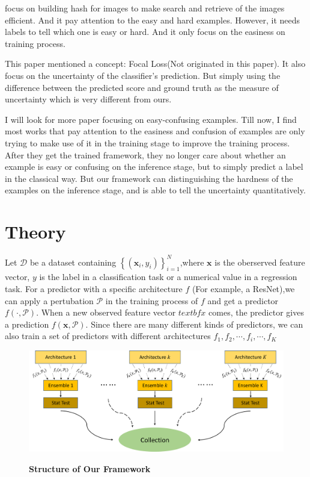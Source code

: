 \documentclass{article}
\begin{document}
\cite{deephash} focus on building hash for images to make search and retrieve of the images efficient. And it pay attention to the easy and hard examples. However, it needs labels to tell which one is easy or hard. And it only focus on the easiness on training process.

\cite{focal_loss} This paper mentioned a concept: Focal Loss(Not originated in this paper). It also focus on the uncertainty of the classifier’s prediction. But simply using the difference between the predicted score and ground truth as the measure of uncertainty which is very different from ours.

I will look for more paper focusing on easy-confusing examples. Till now, I find most works that pay attention to the easiness and confusion of examples are only trying to make use of it in the training stage to improve the training process. After they get the trained framework, they no longer care about whether an example is easy or confusing on the inference stage, but to simply predict a label in the classical way. But our framework can distinguishing the hardness of the examples on the inference stage, and is able to tell the uncertainty quantitatively.

\section{Theory}

Let $\mathcal{D}$ be a dataset containing $\left\{\left( \textbf{x}_i ,y_i\right)\right\}_{i=1}^N $,where $\textbf{x}$ is the oberserved feature vector, $y$ is the label in a classification task or a numerical value in a regression task. For a predictor with a specific architecture $f$ (For example, a ResNet),we can apply a pertubation $\mathcal{P}$ in the training process of $f$ and get a predictor $f \left(\cdot , \mathcal{P}\right)$. When a new observed feature vector $textbf{x}$ comes, the predictor gives a prediction $f \left(\textbf{x} , \mathcal{P}\right)$. Since there are many different kinds of predictors, we can also train a set of predictors with different architectures $f_1,f_2,\cdots,f_i,\cdots,f_K$

\begin{figure}[H]
    \includegraphics[scale=0.55]{figs/overall_structure.png}
\label{fig:struc}
\caption{\textbf{Structure of Our Framework}}
\end{figure}
\end{document}
